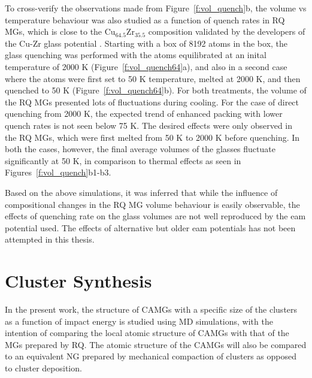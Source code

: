 To cross-verify the observations made from Figure~\ref{f:vol_quench}b, the volume vs temperature behaviour was also studied as a function of quench rates in \czsix RQ MGs, which is close to the Cu$_{64.5}$Zr$_{35.5}$ composition validated by the developers of the Cu-Zr glass potential \cite{Mendelev2019}. Starting with a box of 8192 atoms in the box, the glass quenching was performed with the atoms equilibrated at an inital temperature of 2000 K (Figure~\ref{f:vol_quench64}a), and also in a second case where the atoms were first set to 50 K temperature, melted at 2000 K, and then quenched to 50 K (Figure~\ref{f:vol_quench64}b). For both treatments, the volume of the RQ MGs presented lots of fluctuations during cooling. For the case of direct quenching from 2000 K, the expected trend of enhanced packing with lower quench rates is not seen below 75 K. The desired effects were only observed in the \czsix RQ MGs, which were first melted from 50 K to 2000 K before quenching. In both the cases, however, the final average volumes of the glasses fluctuate significantly at 50 K, in comparison to thermal effects as seen in Figures~\ref{f:vol_quench}b1-b3. \par 

Based on the above simulations, it was inferred that while the influence of compositional changes in the RQ MG volume behaviour is easily observable, the effects of quenching rate on the glass volumes are not well reproduced by the \gls{eam} potential used. The effects of alternative but older \gls{eam} potentials \cite{Cheng2008,Mendelev2009} has not been attempted in this thesis.

%
\section{Cluster Synthesis} \label{s:clus}

\begin{changebar}
In the present work, the structure of CAMGs with a specific size of the clusters as a function of impact energy is studied using MD simulations, with the intention of comparing the local atomic structure of CAMGs with that of the MGs prepared by RQ. The atomic structure of the CAMGs will also be compared to an equivalent NG prepared by mechanical compaction of clusters as opposed to cluster deposition. \par
\end{changebar}

